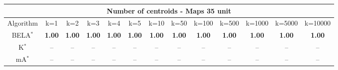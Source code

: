 \begin{tabular}{c|cccccccccccc}\toprule
\multicolumn{13}{c}{Number of centroids - Maps 35 unit}\\ \midrule
Algorithm & k=1 & k=2 & k=3 & k=4 & k=5 & k=10 & k=50 & k=100 & k=500 & k=1000 & k=5000 & k=10000 \\ \midrule
BELA$^*$ & \textbf{1.00} & \textbf{1.00} & \textbf{1.00} & \textbf{1.00} & \textbf{1.00} & \textbf{1.00} & \textbf{1.00} & \textbf{1.00} & \textbf{1.00} & \textbf{1.00} & \textbf{1.00} & \textbf{1.00} \\
K$^*$ & -- & -- & -- & -- & -- & -- & -- & -- & -- & -- & -- & -- \\
mA$^*$ & -- & -- & -- & -- & -- & -- & -- & -- & -- & -- & -- & -- \\ \bottomrule 
\end{tabular}
